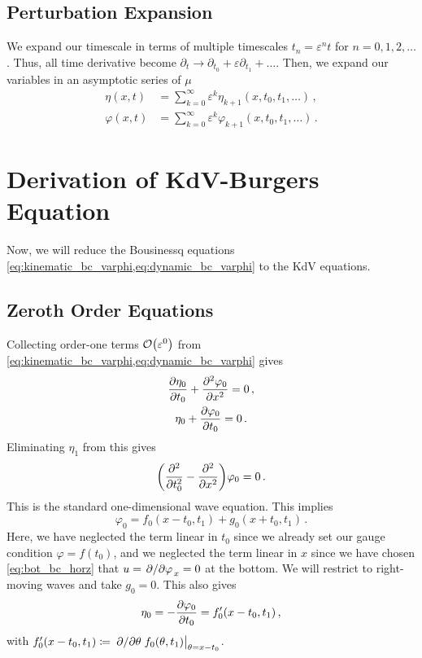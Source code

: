 \documentclass{jfm}
\renewcommand*{\epsilon}{\varepsilon}
\begin{document}
\subsection{Perturbation Expansion}
\label{sec:shallow_water}
We expand our timescale in terms of multiple timescales $t_n =
\epsilon^n t$ for $n= 0,1,2,\ldots$.
Thus, all time derivative become $\partial_t \to \partial_{t_0} +
\epsilon \partial_{t_1} + \ldots$.
Then, we expand our variables in an asymptotic series of $\mu$
\begin{align}
  \eta(x,t) &= \sum_{k=0}^{\infty} \epsilon^k
    \eta_{k+1}(x,t_0,t_1,\ldots) \,, \\
  \varphi(x,t) &= \sum_{k=0}^{\infty} \epsilon^k
    \varphi_{k+1}(x,t_0,t_1,\ldots) \,.
\end{align}

\section{Derivation of KdV-Burgers Equation}
Now, we will reduce the Bousinessq equations
\cref{eq:kinematic_bc_varphi,eq:dynamic_bc_varphi} to the KdV equations.
\subsection{Zeroth Order Equations}
Collecting order-one terms $\order{\epsilon^0}$ from
\cref{eq:kinematic_bc_varphi,eq:dynamic_bc_varphi} gives
\begin{gather}
  \pdv{\eta_0}{t_0} + \pdv[2]{\varphi_0}{x} = 0 \,, \\
  \eta_0 + \pdv{\varphi_0}{t_0} = 0 \,.
\end{gather}
Eliminating $\eta_1$ from this gives
\begin{equation}
  \pqty{\pdv[2]{t_0} - \pdv[2]{x} } \varphi_0 = 0 \,.
  \label{eq:wave_eq}
\end{equation}
This is the standard one-dimensional wave equation.
This implies
\begin{equation}
  \varphi_0 = f_0(x-t_0,t_1) + g_0(x+t_0,t_1) \,.
  \label{eq:phi0_sol}
\end{equation}
Here, we have neglected the term linear in $t_0$ since we already set
our gauge condition $\varphi = f(t_0)$, and we neglected the term linear
in $x$ since we have chosen \cref{eq:bot_bc_horz} that $u =
\pdv*{\varphi}_x = 0$ at the bottom.
We will restrict to right-moving waves and take $g_0 = 0$.
This also gives
\begin{equation}
  \eta_0 = - \pdv{\varphi_0}{t_0} = f_0'(x-t_0,t_1) \,,
  \label{eq:eta0_sol}
\end{equation}
with $f_0'(x-t_0,t_1) \coloneqq \eval{\pdv*{\theta}
f_0(\theta,t_1)}_{\theta = x-t_0}$.
\end{document}

